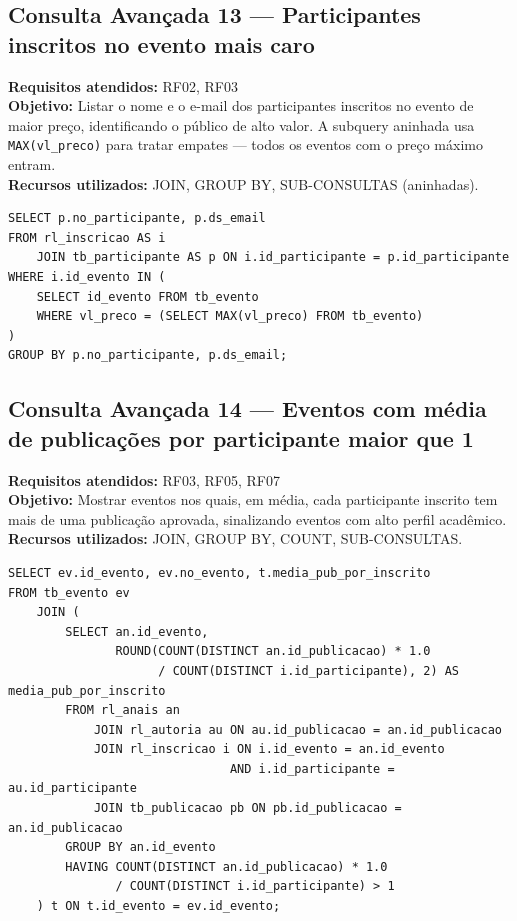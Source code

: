 \documentclass[12pt,a4paper]{article}
\begin{document}
\subsection{Consulta Avançada 13 --- Participantes inscritos no evento mais caro}
\textbf{Requisitos atendidos:} RF02, RF03 \\
\textbf{Objetivo:} Listar o nome e o e-mail dos participantes inscritos no evento de maior preço, identificando o público de alto valor. A subquery aninhada usa \texttt{MAX(vl\_preco)} para tratar empates --- todos os eventos com o preço máximo entram. \\
\textbf{Recursos utilizados:} JOIN, GROUP BY, SUB-CONSULTAS (aninhadas).
\begin{lstlisting}[caption={QA13 --- Participantes inscritos no(s) evento(s) mais caro(s).}]
SELECT p.no_participante, p.ds_email
FROM rl_inscricao AS i
    JOIN tb_participante AS p ON i.id_participante = p.id_participante
WHERE i.id_evento IN (
    SELECT id_evento FROM tb_evento
    WHERE vl_preco = (SELECT MAX(vl_preco) FROM tb_evento)
)
GROUP BY p.no_participante, p.ds_email;
\end{lstlisting}

\subsection{Consulta Avançada 14 --- Eventos com média de publicações por participante maior que 1}
\textbf{Requisitos atendidos:} RF03, RF05, RF07 \\
\textbf{Objetivo:} Mostrar eventos nos quais, em média, cada participante inscrito tem mais de uma publicação aprovada, sinalizando eventos com alto perfil acadêmico. \\
\textbf{Recursos utilizados:} JOIN, GROUP BY, COUNT, SUB-CONSULTAS.
\begin{lstlisting}[caption={QA14 --- Eventos com média de publicações por inscrito maior que 1.}]
SELECT ev.id_evento, ev.no_evento, t.media_pub_por_inscrito
FROM tb_evento ev
    JOIN (
        SELECT an.id_evento,
               ROUND(COUNT(DISTINCT an.id_publicacao) * 1.0
                     / COUNT(DISTINCT i.id_participante), 2) AS media_pub_por_inscrito
        FROM rl_anais an
            JOIN rl_autoria au ON au.id_publicacao = an.id_publicacao
            JOIN rl_inscricao i ON i.id_evento = an.id_evento
                               AND i.id_participante = au.id_participante
            JOIN tb_publicacao pb ON pb.id_publicacao = an.id_publicacao
        GROUP BY an.id_evento
        HAVING COUNT(DISTINCT an.id_publicacao) * 1.0
               / COUNT(DISTINCT i.id_participante) > 1
    ) t ON t.id_evento = ev.id_evento;
\end{lstlisting}
\end{document}
